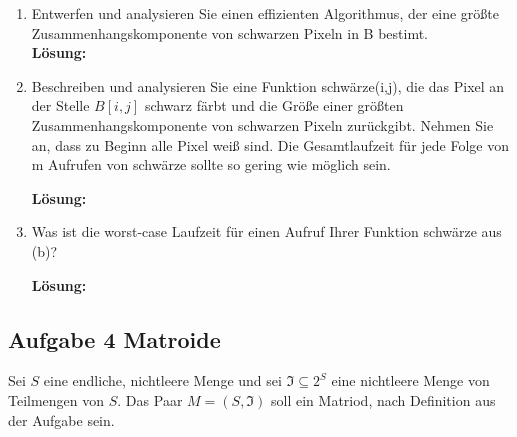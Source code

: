 \documentclass[11pt,a4paper,ngerman]{article}
\begin{document}
\begin{enumerate}[\bfseries (a)]

\item Entwerfen und analysieren Sie einen effizienten Algorithmus, der eine größte Zusammenhangskomponente von schwarzen Pixeln in B bestimt.\\

\textbf{Lösung:}

\item Beschreiben und analysieren Sie eine Funktion schwärze(i,j), die das Pixel an der Stelle $B[i,j]$ schwarz färbt und die Größe einer größten Zusammenhangskomponente von schwarzen Pixeln zurückgibt. Nehmen Sie an, dass zu Beginn alle Pixel weiß sind. Die Gesamtlaufzeit für jede Folge von m Aufrufen von schwärze sollte so gering wie möglich sein.

\textbf{Lösung:}

\item Was ist die worst-case Laufzeit für einen Aufruf Ihrer Funktion schwärze aus (b)?

\textbf{Lösung:}

\end{enumerate}

\subsection*{Aufgabe 4 \mdseries Matroide}

Sei $S$ eine endliche, nichtleere Menge und sei $\mathfrak{I} \subseteq 2^S$ eine nichtleere Menge von Teilmengen von $S$. Das Paar $M = (S, \mathfrak{I})$ soll ein Matriod, nach Definition aus der Aufgabe sein.
\end{document}
